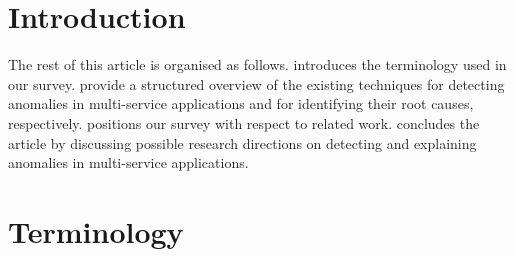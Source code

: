 \documentclass[acmsmall,nonacm]{acmart} %
\begin{document}




\maketitle

\section{Introduction}
\label{sec:intro}


\smallskip \noindent
The rest of this article is organised as follows.
 introduces the terminology used in our survey.
 provide a structured overview of the existing techniques for detecting anomalies in multi-service applications and for identifying their root causes, respectively.
 positions our survey with respect to related work.
 concludes the article by discussing possible research directions on detecting and explaining anomalies in multi-service applications.

\section{Terminology}
\label{sec:terminology}

\end{document}

